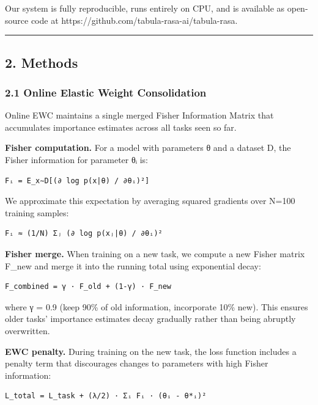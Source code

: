 \documentclass[
]{article}
\begin{document}
Our system is fully reproducible, runs entirely on CPU, and is available
as open-source code at https://github.com/tabula-rasa-ai/tabula-rasa.

\begin{center}\rule{0.5\linewidth}{0.5pt}\end{center}

\subsection{2. Methods}\label{methods}

\subsubsection{2.1 Online Elastic Weight
Consolidation}\label{online-elastic-weight-consolidation}

Online EWC maintains a single merged Fisher Information Matrix that
accumulates importance estimates across all tasks seen so far.

\textbf{Fisher computation.} For a model with parameters θ and a dataset
D, the Fisher information for parameter θᵢ is:

\begin{verbatim}
Fᵢ = E_x∼D[(∂ log p(x|θ) / ∂θᵢ)²]
\end{verbatim}

We approximate this expectation by averaging squared gradients over
N=100 training samples:

\begin{verbatim}
Fᵢ ≈ (1/N) Σⱼ (∂ log p(xⱼ|θ) / ∂θᵢ)²
\end{verbatim}

\textbf{Fisher merge.} When training on a new task, we compute a new
Fisher matrix F\_new and merge it into the running total using
exponential decay:

\begin{verbatim}
F_combined = γ · F_old + (1-γ) · F_new
\end{verbatim}

where γ = 0.9 (keep 90\% of old information, incorporate 10\% new). This
ensures older tasks' importance estimates decay gradually rather than
being abruptly overwritten.

\textbf{EWC penalty.} During training on the new task, the loss function
includes a penalty term that discourages changes to parameters with high
Fisher information:

\begin{verbatim}
L_total = L_task + (λ/2) · Σᵢ Fᵢ · (θᵢ - θ*ᵢ)²
\end{verbatim}
\end{document}
